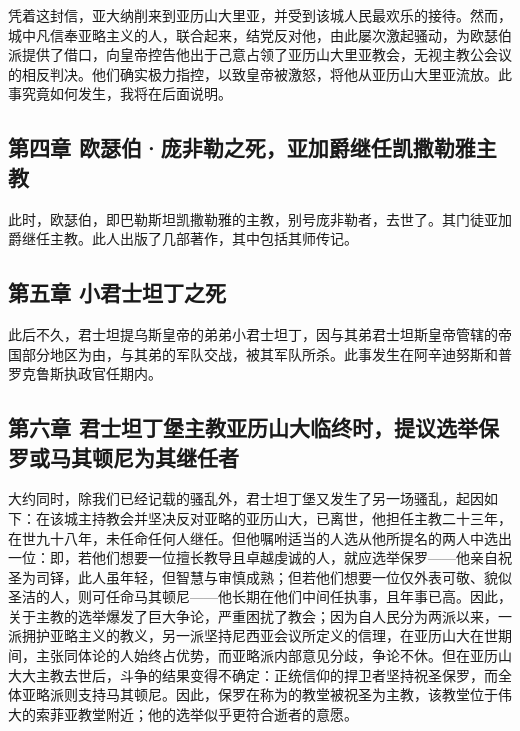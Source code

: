 凭着这封信，亚大纳削来到亚历山大里亚，并受到该城人民最欢乐的接待。然而，城中凡信奉亚略主义的人，联合起来，结党反对他，由此屡次激起骚动，为欧瑟伯派提供了借口，向皇帝控告他出于己意占领了亚历山大里亚教会，无视主教公会议的相反判决。他们确实极力指控，以致皇帝被激怒，将他从亚历山大里亚流放。此事究竟如何发生，我将在后面说明。\par


\subsection{第四章 欧瑟伯·庞非勒之死，亚加爵继任凯撒勒雅主教}

此时，欧瑟伯，即巴勒斯坦凯撒勒雅的主教，别号庞非勒者，去世了。其门徒亚加爵继任主教。此人出版了几部著作，其中包括其师传记。\par


\subsection{第五章 小君士坦丁之死}

此后不久，君士坦提乌斯皇帝的弟弟小君士坦丁，因与其弟君士坦斯皇帝管辖的帝国部分地区为由，与其弟的军队交战，被其军队所杀。此事发生在阿辛迪努斯和普罗克鲁斯执政官任期内。\par


\subsection{第六章 君士坦丁堡主教亚历山大临终时，提议选举保罗或马其顿尼为其继任者}

大约同时，除我们已经记载的骚乱外，君士坦丁堡又发生了另一场骚乱，起因如下：在该城主持教会并坚决反对亚略的亚历山大，已离世，他担任主教二十三年，在世九十八年，未任命任何人继任。但他嘱咐适当的人选从他所提名的两人中选出一位：即，若他们想要一位擅长教导且卓越虔诚的人，就应选举保罗——他亲自祝圣为司铎，此人虽年轻，但智慧与审慎成熟；但若他们想要一位仅外表可敬、貌似圣洁的人，则可任命马其顿尼——他长期在他们中间任执事，且年事已高。因此，关于主教的选举爆发了巨大争论，严重困扰了教会；因为自人民分为两派以来，一派拥护亚略主义的教义，另一派坚持尼西亚会议所定义的信理，在亚历山大在世期间，主张同体论的人始终占优势，而亚略派内部意见分歧，争论不休。但在亚历山大大主教去世后，斗争的结果变得不确定：正统信仰的捍卫者坚持祝圣保罗，而全体亚略派则支持马其顿尼。因此，保罗在称为的教堂被祝圣为主教，该教堂位于伟大的索菲亚教堂附近；他的选举似乎更符合逝者的意愿。\par

